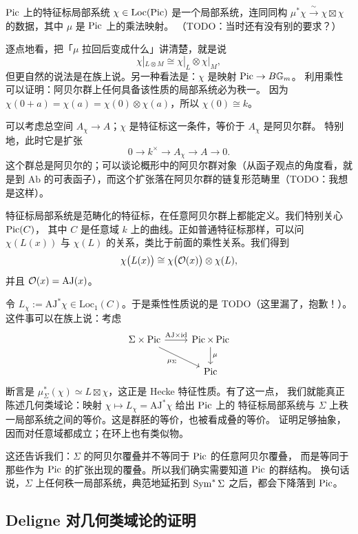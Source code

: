\begin{definition}
$\operatorname{Pic}$ 上的特征标局部系统 $\chi\in\mathrm{Loc}(\operatorname{Pic})$ 是一个局部系统，连同同构
$\mu^*\chi\xrightarrow{\ \sim\ }\chi\boxtimes\chi$ 的数据，其中 $\mu$ 是 $\operatorname{Pic}$ 上的乘法映射。
（TODO：当时还有没有别的要求？）
\end{definition}

逐点地看，把「$\mu$ 拉回后变成什么」讲清楚，就是说
\[
\chi|_{L\otimes M}\cong \chi|_L\otimes \chi|_M,
\]
但更自然的说法是在族上说。另一种看法是：$\chi$ 是映射 $\operatorname{Pic}\to B\mathbb{G}_m$。
利用乘性可以证明：阿贝尔群上任何具备该性质的局部系统必为秩一。
因为 $\chi(0+a)=\chi(a)=\chi(0)\otimes\chi(a)$，所以 $\chi(0)\cong k$。

可以考虑总空间 $A_\chi\to A$；$\chi$ 是特征标这一条件，等价于 $A_\chi$ 是阿贝尔群。
特别地，此时它是扩张
\[
0\longrightarrow k^\times\longrightarrow A_\chi\longrightarrow A\longrightarrow 0.
\]
这个群总是阿贝尔的；可以谈论概形中的阿贝尔群对象（从函子观点的角度看，就是到 $\mathrm{Ab}$
的可表函子），而这个扩张落在阿贝尔群的链复形范畴里（TODO：我想是这样）。

特征标局部系统是范畴化的特征标，在任意阿贝尔群上都能定义。我们特别关心 $\operatorname{Pic}(C)$，
其中 $C$ 是任意域 $k$ 上的曲线。正如普通特征标那样，可以问 $\chi(L(x))$ 与 $\chi(L)$
的关系，类比于前面的乘性关系。我们得到
\[
\chi\bigl(L(x)\bigr)\cong \chi\bigl(\mathcal{O}(x)\bigr)\otimes \chi(L),
\]
并且 $\mathcal{O}(x)=\mathrm{AJ}(x)$。

令 $L_\chi:=\mathrm{AJ}^*\chi\in\mathrm{Loc}_1(C)$。于是乘性性质说的是
TODO（这里漏了，抱歉！）。这件事可以在族上说：考虑
\[
\begin{tikzcd}
\Sigma\times\Pic \arrow[r,"\mathrm{AJ}\times\id"] \arrow[dr,"\mu_\Sigma"'] & \Pic\times\Pic \arrow[d,"\mu"] \\
& \Pic
\end{tikzcd}
\]
断言是 $\mu_\Sigma^*(\chi)\simeq L\boxtimes\chi$，这正是 Hecke 特征性质。有了这一点，
我们就能真正陈述几何类域论：映射 $\chi\mapsto L_\chi=\mathrm{AJ}^*\chi$ 给出 $\operatorname{Pic}$ 上的
特征标局部系统与 $\Sigma$ 上秩一局部系统之间的等价。这是群胚的等价，也被看成叠的等价。
证明足够抽象，因而对任意域都成立；在环上也有类似物。

这还告诉我们：$\Sigma$ 的阿贝尔覆叠并不等同于 $\operatorname{Pic}$ 的任意阿贝尔覆叠，
而是等同于那些作为 $\operatorname{Pic}$ 的扩张出现的覆叠。所以我们确实需要知道 $\operatorname{Pic}$ 的群结构。
换句话说，$\Sigma$ 上任何秩一局部系统，典范地延拓到 $\operatorname{Sym}^*\Sigma$ 之后，都会下降落到 $\operatorname{Pic}$。

\subsection{Deligne 对几何类域论的证明}

